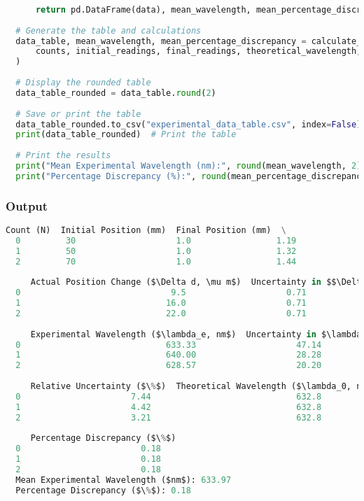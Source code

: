 \documentclass[a4paper,11pt]{article}
\begin{document}
\begin{lstlisting}[language=Python]
  
      return pd.DataFrame(data), mean_wavelength, mean_percentage_discrepancy
  
  # Generate the table and calculations
  data_table, mean_wavelength, mean_percentage_discrepancy = calculate_data(
      counts, initial_readings, final_readings, theoretical_wavelength, uncertainty_position
  )
  
  # Display the rounded table
  data_table_rounded = data_table.round(2)
  
  # Save or print the table
  data_table_rounded.to_csv("experimental_data_table.csv", index=False)  # Save as CSV
  print(data_table_rounded)  # Print the table
  
  # Print the results
  print("Mean Experimental Wavelength (nm):", round(mean_wavelength, 2))
  print("Percentage Discrepancy (%):", round(mean_percentage_discrepancy, 2))  
\end{lstlisting}
\label{Code: Wavelength Determination}
\newpage
\subsubsection*{Output}
\begin{lstlisting}[language=Python]
  Count (N)  Initial Position (mm)  Final Position (mm)  \
  0         30                    1.0                 1.19   
  1         50                    1.0                 1.32   
  2         70                    1.0                 1.44   
  
     Actual Position Change ($\Delta d, \mu m$)  Uncertainty in $$\Delta d$$ ($\mu m$)  \
  0                              9.5                    0.71   
  1                             16.0                    0.71   
  2                             22.0                    0.71   
  
     Experimental Wavelength ($\lambda_e, nm$)  Uncertainty in $\lambda_e$($nm$)  \
  0                             633.33                    47.14   
  1                             640.00                    28.28   
  2                             628.57                    20.20   
  
     Relative Uncertainty ($\%$)  Theoretical Wavelength ($\lambda_0, nm$)  \
  0                      7.44                             632.8   
  1                      4.42                             632.8   
  2                      3.21                             632.8   
  
     Percentage Discrepancy ($\%$)  
  0                        0.18  
  1                        0.18  
  2                        0.18  
  Mean Experimental Wavelength ($nm$): 633.97
  Percentage Discrepancy ($\%$): 0.18

\end{lstlisting}
\newpage
\end{document}
